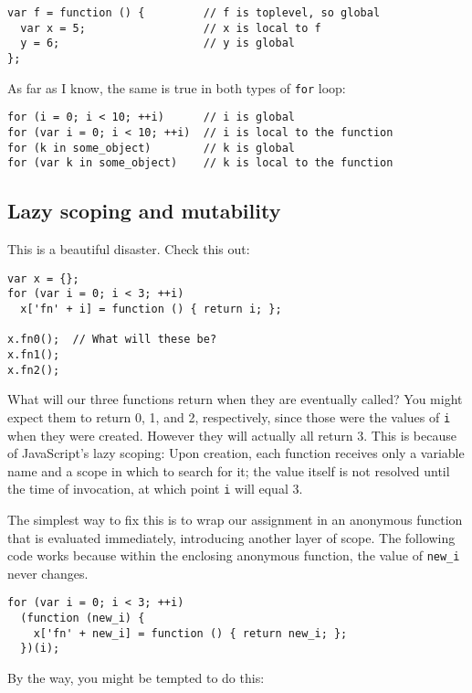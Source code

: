 \documentclass{article}
\begin{document}
\begin{verbatim}
var f = function () {         // f is toplevel, so global
  var x = 5;                  // x is local to f
  y = 6;                      // y is global
};
\end{verbatim}

    As far as I know, the same is true in both types of \verb|for| loop:

\begin{verbatim}
for (i = 0; i < 10; ++i)      // i is global
for (var i = 0; i < 10; ++i)  // i is local to the function
for (k in some_object)        // k is global
for (var k in some_object)    // k is local to the function
\end{verbatim}

\subsection {Lazy scoping and mutability}
    This is a beautiful disaster. Check this out:

\begin{verbatim}
var x = {};
for (var i = 0; i < 3; ++i)
  x['fn' + i] = function () { return i; };

x.fn0();  // What will these be?
x.fn1();
x.fn2();
\end{verbatim}

    What will our three functions return when they are eventually called? You might expect them to return 0, 1, and 2, respectively, since those were the values of \verb|i| when they were
    created. However they will actually all return 3. This is because of JavaScript's lazy scoping: Upon creation, each function receives only a variable name and a scope in which to search
    for it; the value itself is not resolved until the time of invocation, at which point \verb|i| will equal 3.

    The simplest way to fix this is to wrap our assignment in an anonymous function that is evaluated immediately, introducing another layer of scope. The following code works because within
    the enclosing anonymous function, the value of \verb|new_i| never changes.

\begin{verbatim}
for (var i = 0; i < 3; ++i)
  (function (new_i) {
    x['fn' + new_i] = function () { return new_i; };
  })(i);
\end{verbatim}

    By the way, you might be tempted to do this:
\end{document}
